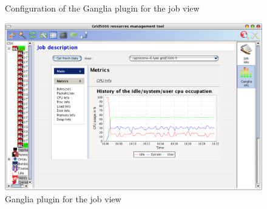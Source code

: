 \begin{itemize}
\begin{figure}[H]
  \caption{Configuration of the Ganglia plugin for the job view}
	\label{fig:GRUDU_view_job_ganglia_prerequisites}
  \end{figure}
  \begin{figure}[H]
  \centering
  \includegraphics[width=0.5\linewidth]{figures/GRUDU_interface4_ganglia.eps}
  \caption{Ganglia plugin for the job view}
	\label{fig:GRUDU_view_job_ganglia}
  \end{figure}

\end{itemize}

